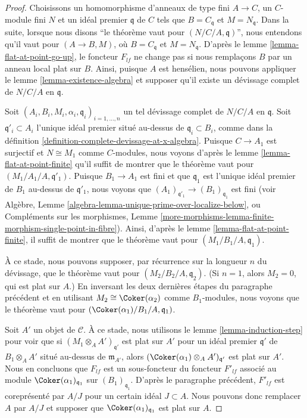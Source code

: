 \begin{proof}
Choisissons un homomorphisme d'anneaux de type fini $A \to C$, un $C$-module fini $N$
et un idéal premier $\mathfrak q$ de $C$ tels que $B = C_{\mathfrak q}$
et $M = N_{\mathfrak q}$. Dans la suite, lorsque nous disons
``le théorème vaut pour $(N/C/A, \mathfrak q)$'', nous entendons qu'il
vaut pour $(A \to B, M)$, où $B = C_{\mathfrak q}$ et
$M = N_{\mathfrak q}$. D'après le
lemme \ref{lemma-flat-at-point-go-up},
le foncteur $F_{lf}$ ne change pas si nous remplaçons $B$ par un anneau local
plat sur $B$. Ainsi, puisque $A$ est hensélien, nous pouvons appliquer le
lemme \ref{lemma-existence-algebra}
et supposer qu'il existe un dévissage complet de
$N/C/A$ en $\mathfrak q$.

\medskip\noindent
Soit $(A_i, B_i, M_i, \alpha_i, \mathfrak q_i)_{i = 1, \ldots, n}$
un tel dévissage complet de $N/C/A$ en $\mathfrak q$. Soit
$\mathfrak q'_i \subset A_i$ l'unique idéal premier situé au-dessus de
$\mathfrak q_i \subset B_i$, comme dans la
définition \ref{definition-complete-devissage-at-x-algebra}.
Puisque $C \to A_1$ est surjectif et $N \cong M_1$ comme $C$-modules,
nous voyons d'après le
lemme \ref{lemma-flat-at-point-finite}
qu'il suffit de montrer que le théorème vaut pour $(M_1/A_1/A, \mathfrak q'_1)$.
Puisque $B_1 \to A_1$ est fini et que $\mathfrak q_1$ est l'unique idéal premier
de $B_1$ au-dessus de $\mathfrak q'_1$, nous voyons que
$(A_1)_{\mathfrak q'_1} \to (B_1)_{\mathfrak q_1}$ est fini (voir
Algèbre, Lemme \ref{algebra-lemma-unique-prime-over-localize-below}, ou
Compléments sur les morphismes,
Lemme \ref{more-morphisms-lemma-finite-morphism-single-point-in-fibre}).
Ainsi, d'après le
lemme \ref{lemma-flat-at-point-finite},
il suffit de montrer que le théorème vaut pour $(M_1/B_1/A, \mathfrak q_1)$.

\medskip\noindent
À ce stade, nous pouvons supposer, par récurrence sur la longueur $n$ du
dévissage, que le théorème vaut pour $(M_2/B_2/A, \mathfrak q_2)$.
(Si $n = 1$, alors $M_2 = 0$, qui est plat sur $A$.)
En inversant les deux dernières étapes du paragraphe précédent et en utilisant
$M_2 \cong \Coker(\alpha_2)$ comme $B_1$-modules, nous voyons
que le théorème vaut pour $(\Coker(\alpha_1)/B_1/A, \mathfrak q_1)$.

\medskip\noindent
Soit $A'$ un objet de $\mathcal{C}$. À ce stade, nous utilisons le
lemme \ref{lemma-induction-step}
pour voir que si $(M_1 \otimes_A A')_{\mathfrak q'}$ est plat
sur $A'$ pour un idéal premier $\mathfrak q'$ de $B_1 \otimes_A A'$
situé au-dessus de $\mathfrak m_{A'}$, alors
$(\Coker(\alpha_1) \otimes_A A')_{\mathfrak q'}$ est plat sur $A'$.
Nous en concluons que $F_{lf}$ est un sous-foncteur du
foncteur $F'_{lf}$ associé au module
$\Coker(\alpha_1)_{\mathfrak q_1}$ sur $(B_1)_{\mathfrak q_1}$.
D'après le paragraphe précédent, $F'_{lf}$ est coreprésenté par
$A/J$ pour un certain idéal $J \subset A$. Nous pouvons donc remplacer $A$ par
$A/J$ et supposer que $\Coker(\alpha_1)_{\mathfrak q_1}$ est
plat sur $A$.


\end{proof}
